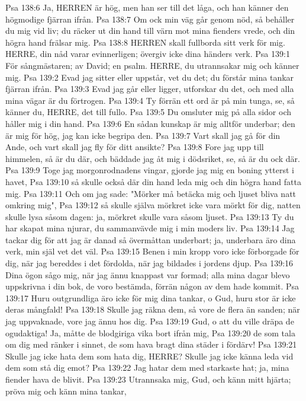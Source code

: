 Psa 138:6  Ja, HERREN är hög, men han ser till det låga, och han känner den högmodige fjärran ifrån.
Psa 138:7  Om ock min väg går genom nöd, så behåller du mig vid liv; du räcker ut din hand till värn mot mina fienders vrede, och din högra hand frälsar mig.
Psa 138:8  HERREN skall fullborda sitt verk för mig. HERRE, din nåd varar evinnerligen; övergiv icke dina händers verk.
Psa 139:1  För sångmästaren; av David; en psalm. HERRE, du utrannsakar mig och känner mig.
Psa 139:2  Evad jag sitter eller uppstår, vet du det; du förstår mina tankar fjärran ifrån.
Psa 139:3  Evad jag går eller ligger, utforskar du det, och med alla mina vägar är du förtrogen.
Psa 139:4  Ty förrän ett ord är på min tunga, se, så känner du, HERRE, det till fullo.
Psa 139:5  Du omsluter mig på alla sidor och håller mig i din hand.
Psa 139:6  En sådan kunskap är mig alltför underbar; den är mig för hög, jag kan icke begripa den.
Psa 139:7  Vart skall jag gå för din Ande, och vart skall jag fly för ditt ansikte?
Psa 139:8  Fore jag upp till himmelen, så är du där, och bäddade jag åt mig i dödsriket, se, så är du ock där.
Psa 139:9  Toge jag morgonrodnadens vingar, gjorde jag mig en boning ytterst i havet,
Psa 139:10  så skulle också där din hand leda mig och din högra hand fatta mig.
Psa 139:11  Och om jag sade: "Mörker må betäcka mig och ljuset bliva natt omkring mig",
Psa 139:12  så skulle själva mörkret icke vara mörkt för dig, natten skulle lysa såsom dagen: ja, mörkret skulle vara såsom ljuset.
Psa 139:13  Ty du har skapat mina njurar, du sammanvävde mig i min moders liv.
Psa 139:14  Jag tackar dig för att jag är danad så övermåttan underbart; ja, underbara äro dina verk, min själ vet det väl.
Psa 139:15  Benen i min kropp voro icke förborgade för dig, när jag bereddes i det fördolda, när jag bildades i jordens djup.
Psa 139:16  Dina ögon sågo mig, när jag ännu knappast var formad; alla mina dagar blevo uppskrivna i din bok, de voro bestämda, förrän någon av dem hade kommit.
Psa 139:17  Huru outgrundliga äro icke för mig dina tankar, o Gud, huru stor är icke deras mångfald!
Psa 139:18  Skulle jag räkna dem, så vore de flera än sanden; när jag uppvaknade, vore jag ännu hos dig.
Psa 139:19  Gud, o att du ville dräpa de ogudaktiga! Ja, måtte de blodgiriga vika bort ifrån mig,
Psa 139:20  de som tala om dig med ränker i sinnet, de som hava bragt dina städer i fördärv!
Psa 139:21  Skulle jag icke hata dem som hata dig, HERRE? Skulle jag icke känna leda vid dem som stå dig emot?
Psa 139:22  Jag hatar dem med starkaste hat; ja, mina fiender hava de blivit.
Psa 139:23  Utrannsaka mig, Gud, och känn mitt hjärta; pröva mig och känn mina tankar,
